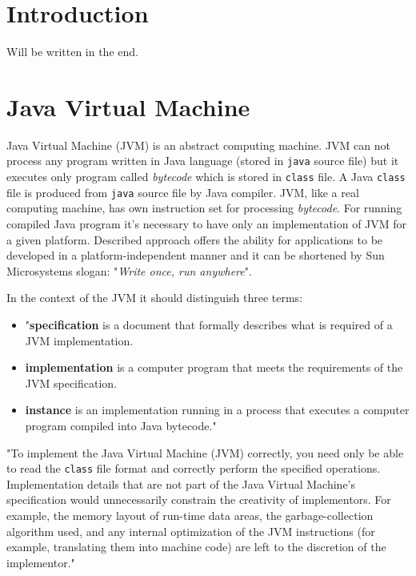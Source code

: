 \documentclass[
  digital, %
  oneside,
  notable, %
  nolof,     %
  nolot     %
]{fithesis3}
\begin{document}
\chapter{Introduction}
    Will be written in the end.

\chapter{Java Virtual Machine}

Java Virtual Machine (JVM) is an abstract computing machine. JVM can not process any program written in Java language (stored in \texttt{java} source file) but it executes only program called \textit{bytecode} which is stored in \texttt{class} file. A Java \texttt{class} file is produced from \texttt{java} source file by Java compiler. JVM, like a real computing machine, has own instruction set for processing \textit{bytecode}. For running compiled Java program it's necessary to have only an implementation of JVM for a given platform. Described approach offers the ability for applications to be developed in a platform-independent manner and it can be shortened by Sun Microsystems slogan: "\textit{Write once, run anywhere}".\cite{spec}

In the context of the JVM it should distinguish three terms:
\begin{itemize}
	\item "\textbf{specification} is a document that formally describes what is required of a JVM implementation.
	\item \textbf{implementation} is a computer program that meets the requirements of the JVM specification.
	\item \textbf{instance} is an implementation running in a process that executes a computer program compiled into Java bytecode."\cite{brief}
\end{itemize}


"To implement the Java Virtual Machine (JVM) correctly, you need only be able to read the \texttt{class} file format and correctly perform the specified operations. Implementation details that are not part of the Java Virtual Machine's specification would unnecessarily constrain the creativity of implementors. For example, the memory layout of run-time data areas, the garbage-collection algorithm used, and any internal optimization of the JVM instructions (for example, translating them into machine code) are left to the discretion of the implementor." \cite{spec}
\end{document}
